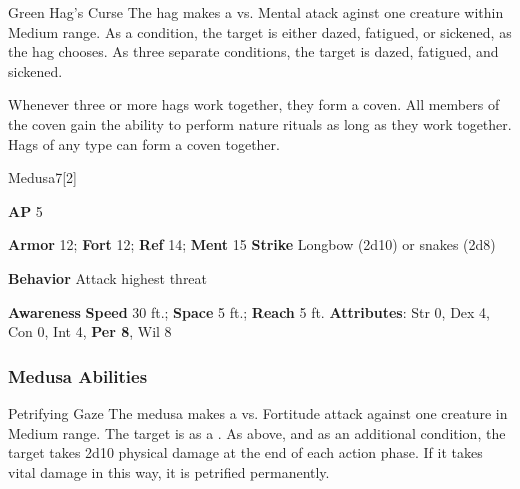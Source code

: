 \vspace{0.5em}
\begin{ability}{Green Hag's Curse}
The hag makes a  vs. Mental atack aginst one creature within Medium range.
\hit As a condition, the target is either dazed, fatigued, or sickened, as the hag chooses.
\crit As three separate conditions, the target is dazed, fatigued, and sickened.
\end{ability}

Whenever three or more hags work together, they form a coven.
All members of the coven gain the ability to perform nature rituals as long as they work together.
Hags of any type can form a coven together.

\begin{monsection}{Medusa}{7}[2]
\vspace{-1em}\vspace{-1em}
\begin{spellcontent}
\begin{spelltargetinginfo}
{\textbf{AP} 5}

\pari \textbf{Armor} 12;
\textbf{Fort} 12;
\textbf{Ref} 14;
\textbf{Ment} 15
\pari \textbf{Strike} Longbow  (2d10) or snakes  (2d8)



\pari \textbf{Behavior} Attack highest threat
\end{spelltargetinginfo}
\end{spellcontent}

\begin{monsterfooter}
\pari \textbf{Awareness} 
\pari \textbf{Speed} 30 ft.;
\textbf{Space} 5 ft.;
\textbf{Reach} 5 ft.
\pari \textbf{Attributes}:
Str 0,
Dex 4,
Con 0,
Int 4,
\textbf{Per 8},
Wil 8
\end{monsterfooter}
\end{monsection}


\subsubsection{Medusa Abilities}

\begin{ability}{Petrifying Gaze}
The medusa makes a  vs. Fortitude attack against one creature in Medium range.
\hit The target is  as a .
\crit As above, and as an additional condition, the target takes 2d10 physical damage at the end of each action phase.
If it takes vital damage in this way, it is petrified permanently.
\end{ability}

